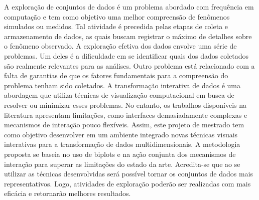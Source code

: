 \begin{resumo}
%
A exploração de conjuntos de dados é um problema abordado
com frequência em computação e tem como objetivo uma melhor
compreensão de fenômenos simulados ou medidos.
%
Tal atividade é precedida pelas etapas de coleta e
armazenamento de dados, as quais buscam registrar o máximo
de detalhes sobre o fenômeno observado.
%
A exploração efetiva dos dados envolve uma série de
problemas. 
%
Um deles é a dificuldade em se identificar quais
dos dados coletados são realmente relevantes para as
análises. 
%
Outro problema está relacionado com a falta de
garantias de que os fatores fundamentais para a compreensão
do problema tenham sido coletados.
% 
A transformação interativa de dados é uma abordagem que
utiliza técnicas de visualização computacional em busca de
resolver ou minimizar esses problemas. 
%
No entanto, os trabalhos disponíveis na literatura
apresentam limitações, como interfaces demasiadamente
complexas e mecanismos de interação pouco flexíveis. 
%
Assim, este projeto de mestrado tem como objetivo
desenvolver em um ambiente integrado novas técnicas visuais
interativas para a transformação de dados multidimensionais.
%
A metodologia proposta se baseia no uso de biplots e na
ação conjunta dos mecanismos de interação para superar as
limitações do estado da arte.
%
Acredita-se que ao se utilizar as técnicas desenvolvidas
será possível tornar os conjuntos de dados mais
representativos. 
%
Logo, atividades de exploração poderão ser
realizadas com mais eficácia e retornarão melhores
resultados.


\end{resumo}
